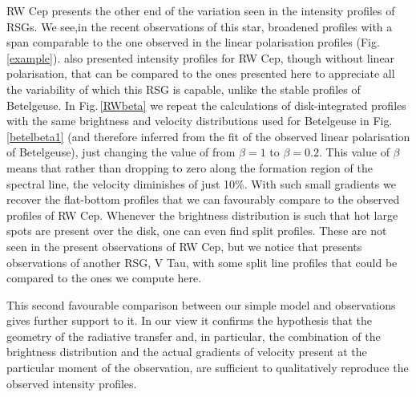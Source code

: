 \documentclass{/Users/art2/TeX/aanda/aa}
\begin{document}
RW Cep presents the other end of the variation seen in the intensity profiles of RSGs. We see,in the recent observations of this star, 
broadened profiles with a span comparable to the one observed in the linear polarisation profiles (Fig. \ref{example}). 
\cite{josselin_atmospheric_2007} also 
presented intensity profiles for RW Cep, though without linear polarisation, that can be compared to the ones presented here to appreciate 
all the variability of which this RSG is capable, unlike the stable profiles of Betelgeuse.
 In Fig.\,\ref{RWbeta} we repeat 
the  calculations of disk-integrated profiles with the same brightness and velocity distributions used for Betelgeuse in Fig.\,\ref{betelbeta1}
(and therefore inferred 
from the fit of the observed linear polarisation of Betelgeuse), just changing the value of from $\beta=1$ to $\beta=0.2$. This value of $\beta$ means 
that rather than dropping to zero along the formation region of the spectral line, the velocity diminishes of just 10\%. With such 
small gradients we recover the flat-bottom profiles that we can favourably compare to the observed profiles of RW Cep. Whenever 
the brightness distribution is such that hot large spots are present over the disk, one can even find split profiles. These are not 
seen in the present observations of RW Cep, but we notice that \cite{kravchenko_tomography_2018} presents observations of another RSG, V Tau, with 
some split line profiles that could be compared to the ones we compute here. 

This second favourable comparison between our simple model and observations gives further support to it. In our view it confirms 
the hypothesis that the geometry of the radiative transfer and, in particular, the combination of the brightness distribution and 
the actual gradients of velocity present at the particular moment of the observation, are sufficient to qualitatively reproduce 
the observed intensity profiles. 
\end{document}
